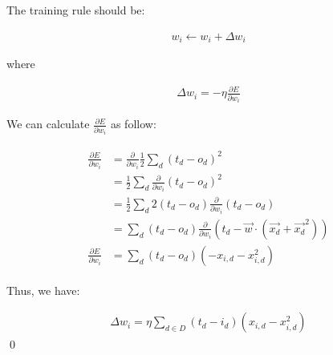 \documentclass[preview]{standalone}
\begin{document}
\section{}

The training rule should be:

\begin{align}
    w_i\leftarrow w_i + \Delta w_i
\end{align}

where

\begin{align}
    \Delta w_i = -\eta\frac{\partial E}{\partial w_i}
\end{align}

We can calculate $\frac{\partial E}{\partial w_i}$ as follow:

\begin{align}
\begin{split}
\frac{\partial E}{\partial w_i}
&= \frac{\partial}{\partial w_i}\frac{1}{2}\sum_d(t_d-o_d)^2\\
&= \frac{1}{2}\sum_d\frac{\partial}{\partial w_i}(t_d-o_d)^2\\
&= \frac{1}{2}\sum_d2(t_d-o_d)\frac{\partial}{\partial w_i}(t_d-o_d)\\
&= \sum_d(t_d-o_d)\frac{\partial}{\partial w_i}(t_d-\vec{w}\cdot(\vec{x_d}+\vec{x_d}^2))\\
\frac{\partial E}{\partial w_i}
&= \sum_d(t_d-o_d)(-x_{i,d}-x_{i,d}^2)
\end{split}
\end{align}

Thus, we have:

\begin{align}
    \Delta w_i = \eta \sum_{d\in D} (t_d - i_d)(x_{i,d}-x_{i,d}^2)
\end{align}
\qed
\end{document}
